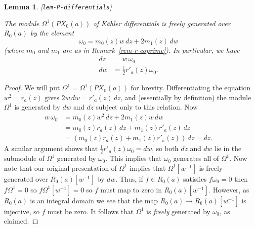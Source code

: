 \documentclass[reqno]{amsart}
\newcommand{\lbl}[1]{\label{#1}\textup{[\texttt{#1}]}\par}
\newcommand{\lbl}{\label}
\newcommand{\Om}        {\Omega}
\newcommand{\om}        {\omega}
\newcommand{\half}      {\tfrac{1}{2}}
\renewcommand{\:}{\colon}
\newtheorem{lemma}[theorem]{Lemma}
\theoremstyle{definition}
\begin{document}
\begin{lemma}\lbl{lem-P-differentials}
 The module $\Om^1(PX_0(a))$ of K\"ahler differentials is freely
 generated over $R_0(a)$ by the element
 \[ \om_0 = m_0(z)w\,dz + 2m_1(z)\,dw \]
 (where $m_0$ and $m_1$ are as in Remark~\ref{rem-r-coprime}).  In
 particular, we have
 \begin{align*}
  dz &= w\,\om_0 \\
  dw &= \half r'_a(z)\om_0.
 \end{align*}
\end{lemma}
\begin{proof}
 We will put $\Om^1=\Om^1(PX_0(a))$ for brevity.  Differentiating the
 equation $w^2=r_a(z)$ gives $2w\,dw=r'_a(z)\,dz$, and (essentially by
 definition) the module $\Om^1$ is generated by $dw$ and $dz$ subject
 only to this relation.  Now
 \begin{align*}
  w\,\om_0 &= m_0(z)w^2\,dz + 2m_1(z)w\,dw \\
           &= m_0(z)r_a(z)\,dz + m_1(z)r'_a(z)\,dz \\
           &= (m_0(z)r_a(z)+m_1(z)r'_a(z))\,dz = dz.
 \end{align*}
 A similar argument shows that $\half r'_a(z)\om_0=dw$, so both $dz$
 and $dw$ lie in the submodule of $\Om^1$ generated by $\om_0$.  This
 implies that $\om_0$ generates all of $\Om^1$.  Now note that our
 original presentation of $\Om^1$ implies that $\Om^1[w^{-1}]$ is
 freely generated over $R_0(a)[w^{-1}]$ by $dw$.  Thus, if
 $f\in R_0(a)$ satisfies $f\om_0=0$ then $f\Om^1=0$ so
 $f\Om^1[w^{-1}]=0$ so $f$ must map to zero in $R_0(a)[w^{-1}]$.
 However, as $R_0(a)$ is an integral domain we see that the map
 $R_0(a)\to R_0(a)[w^{-1}]$ is injective, so $f$ must be zero.  It
 follows that $\Om^1$ is \emph{freely} generated by $\om_0$, as
 claimed.
\end{proof}
\end{document}
